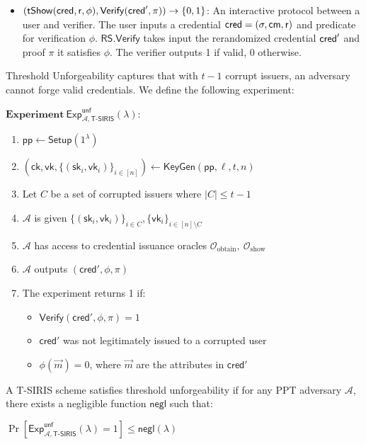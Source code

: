 \begin{definition}[tSIRIS]
\begin{itemize}
    \item $(\mathsf{tShow}(\mathsf{cred}, \mathsf{r}, \phi), \mathsf{Verify}(\mathsf{cred}', \pi)) \to \{0,1\}$: An interactive protocol between a user and verifier. The user inputs a credential $\mathsf{cred} = (\sigma, \mathsf{cm}, \mathsf{r})$ and predicate for verification $\phi$. $\mathsf{RS.Verify}$ takes input the rerandomized credential $\mathsf{cred}'$ and proof $\pi$ it satisfies $\phi$. The verifier outputs 1 if valid, 0 otherwise.
\end{itemize}
\end{definition}




\begin{definition}
Threshold Unforgeability captures that with $t-1$ corrupt issuers, an adversary cannot forge valid credentials. We define the following experiment:

$\textbf{Experiment}~\mathsf{Exp}^{\mathsf{unf}}_{\mathcal{A},\mathsf{T\text{-}SIRIS}}(\lambda):$
\begin{enumerate}
    \item $\mathsf{pp} \leftarrow \mathsf{Setup}(1^\lambda)$
    \item $(\mathsf{ck}, \mathsf{vk}, \{(\mathsf{sk}_i, \mathsf{vk}_i)\}_{i\in[n]}) \leftarrow \mathsf{KeyGen}(\mathsf{pp}, \ell, t, n)$
    \item Let $C$ be a set of corrupted issuers where $|C| \leq t-1$
    \item $\mathcal{A}$ is given $\{(\mathsf{sk}_i, \mathsf{vk}_i)\}_{i\in C}, \{\mathsf{vk}_i\}_{i\in[n]\setminus C}$
    \item $\mathcal{A}$ has access to credential issuance oracles $\mathcal{O}_{\text{obtain}},~\mathcal{O}_{\text{show}}$
    \item $\mathcal{A}$ outputs $(\mathsf{cred}', \phi, \pi)$
    \item The experiment returns 1 if:
    \begin{itemize}
        \item $\mathsf{Verify}(\mathsf{cred}', \phi, \pi) = 1$
        \item $\mathsf{cred}'$ was not legitimately issued to a corrupted user
        \item $\phi(\vec{m}) = 0$, where $\vec{m}$ are the attributes in $\mathsf{cred}'$
    \end{itemize}
\end{enumerate}

A T-SIRIS scheme satisfies threshold unforgeability if for any PPT adversary $\mathcal{A}$, there exists a negligible function $\mathsf{negl}$ such that:

$\Pr[\mathsf{Exp}^{\mathsf{unf}}_{\mathcal{A},\mathsf{T\text{-}SIRIS}}(\lambda) = 1] \leq \mathsf{negl}(\lambda)$
\end{definition}








